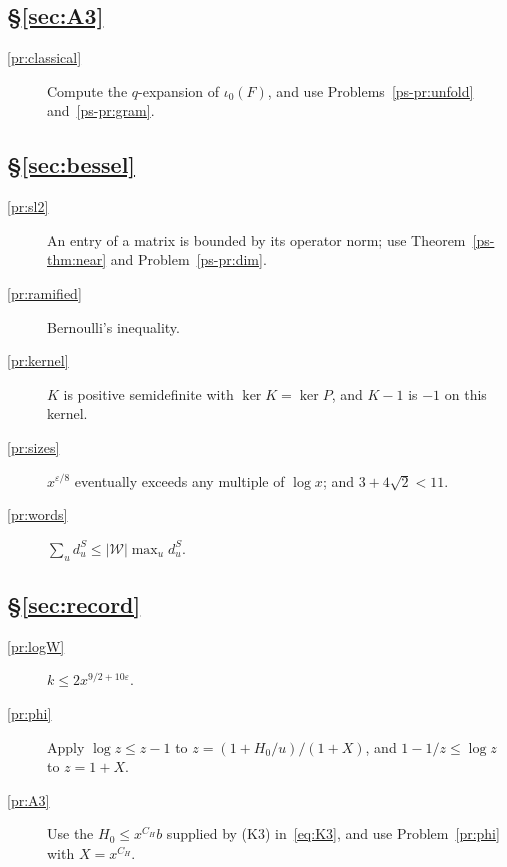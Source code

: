 \documentclass[reqno]{amsart}
\theoremstyle{definition}
\theoremstyle{plain}
\newcommand{\Wc}{\mathcal{W}}
\newcommand{\dS}{d^{S}}
\begin{document}
\subsection*{\S\ref{sec:A3}}
\begin{description}
\item[\ref{pr:classical}] Compute the \(q\)-expansion of \(\iota_0(F)\), and use Problems~\ref{ps-pr:unfold} and~\ref{ps-pr:gram}.
\end{description}

\subsection*{\S\ref{sec:bessel}}
\begin{description}
\item[\ref{pr:sl2}] An entry of a matrix is bounded by its operator norm; use Theorem~\ref{ps-thm:near} and Problem~\ref{ps-pr:dim}.
\item[\ref{pr:ramified}] Bernoulli's inequality.
\item[\ref{pr:kernel}] \(K\) is positive semidefinite with \(\ker K = \ker P\), and \(K - 1\) is \(-1\) on this kernel.
\item[\ref{pr:sizes}] \(x^{\varepsilon/8}\) eventually exceeds any multiple of \(\log x\); and \(3 + 4\sqrt2 < 11\).
\item[\ref{pr:words}] \(\sum_u \dS_u \le \lvert\Wc\rvert\max_u \dS_u\).
\end{description}

\subsection*{\S\ref{sec:record}}
\begin{description}
\item[\ref{pr:logW}] \(k \le 2x^{9/2+10\varepsilon}\).
\item[\ref{pr:phi}] Apply \(\log z \le z - 1\) to \(z = (1 + H_0/u)/(1 + X)\), and \(1 - 1/z \le \log z\) to \(z = 1 + X\).
\item[\ref{pr:A3}] Use the \(H_0 \le x^{C_H}b\) supplied by (K3) in~\eqref{eq:K3}, and use Problem~\ref{pr:phi} with \(X = x^{C_H}\).
\end{description}
\end{document}
